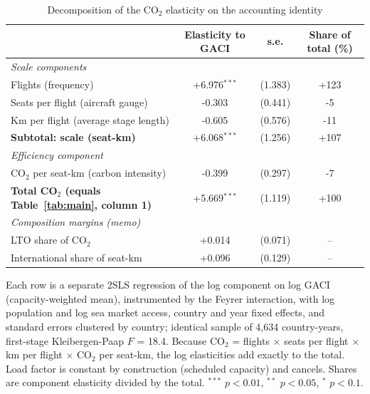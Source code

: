 \begin{table}[htbp]
\centering
\begin{threeparttable}
\caption{Decomposition of the CO$_2$ elasticity on the accounting identity}
\label{tab:decomp}
\footnotesize
\begin{tabular}{lccc}
\toprule
 & Elasticity to GACI & s.e. & Share of total (\%) \\
\midrule
\multicolumn{4}{l}{\textit{Scale components}} \\
  Flights (frequency) & +6.976$^{***}$ & (1.383) & +123 \\
  Seats per flight (aircraft gauge) & -0.303 & (0.441) & -5 \\
  Km per flight (average stage length) & -0.605 & (0.576) & -11 \\
  \textbf{Subtotal: scale (seat-km)} & +6.068$^{***}$ & (1.256) & +107 \\
\multicolumn{4}{l}{\textit{Efficiency component}} \\
  CO$_2$ per seat-km (carbon intensity) & -0.399 & (0.297) & -7 \\
\midrule
  \textbf{Total CO$_2$ (equals Table~\ref{tab:main}, column 1)} & +5.669$^{***}$ & (1.119) & +100 \\
\midrule
\multicolumn{4}{l}{\textit{Composition margins (memo)}} \\
  LTO share of CO$_2$ & +0.014 & (0.071) & -- \\
  International share of seat-km & +0.096 & (0.129) & -- \\
\bottomrule
\end{tabular}
\begin{tablenotes}\footnotesize
\item Each row is a separate 2SLS regression of the log component on log GACI (capacity-weighted mean), instrumented by the Feyrer interaction, with log population and log sea market access, country and year fixed effects, and standard errors clustered by country; identical sample of 4,634 country-years, first-stage Kleibergen-Paap $F$ = 18.4. Because CO$_2$ = flights $\times$ seats per flight $\times$ km per flight $\times$ CO$_2$ per seat-km, the log elasticities add exactly to the total. Load factor is constant by construction (scheduled capacity) and cancels. Shares are component elasticity divided by the total. $^{***}$ $p<0.01$, $^{**}$ $p<0.05$, $^{*}$ $p<0.1$.
\end{tablenotes}
\end{threeparttable}
\end{table}

